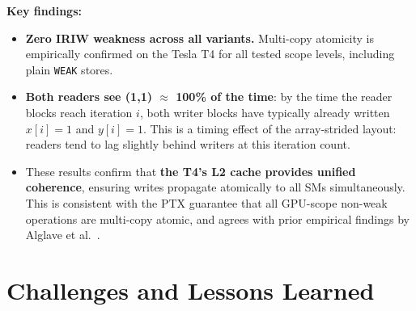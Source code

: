 \documentclass[a4paper]{article}
\begin{document}
\textbf{Key findings:}
\begin{itemize}
  \item \textbf{Zero IRIW weakness across all variants.}
    Multi-copy atomicity is empirically confirmed on the Tesla T4 for all tested scope levels, including plain \texttt{WEAK} stores.
  \item \textbf{Both readers see (1,1) $\approx$ 100\% of the time}: by the time the reader blocks reach iteration $i$, both writer blocks have typically already written $x[i]=1$ and $y[i]=1$. This is a timing effect of the array-strided layout: readers tend to lag slightly behind writers at this iteration count.
  \item These results confirm that \textbf{the T4's L2 cache provides unified coherence}, ensuring writes propagate atomically to all SMs simultaneously. This is consistent with the PTX guarantee that all GPU-scope non-weak operations are multi-copy atomic, and agrees with prior empirical findings by Alglave et al.\ \cite{Alglave2015GPU}.
\end{itemize}

\section{Challenges and Lessons Learned}
\end{document}
